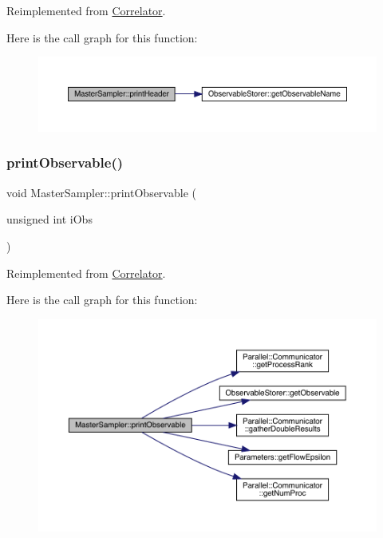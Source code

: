 Reimplemented from \mbox{\hyperlink{class_correlator_ac7c5a07d7cbee97c417a1659b93083b2}{Correlator}}.

Here is the call graph for this function\+:\nopagebreak
\begin{figure}[H]
\begin{center}
\leavevmode
\includegraphics[width=350pt]{class_master_sampler_a51b207672764c100e1ae258fd2e33fcf_cgraph}
\end{center}
\end{figure}
\mbox{\label{class_master_sampler_a41853c3e4ab52fca7d93cf80e8702b7a}} 
\subsubsection{\texorpdfstring{printObservable()}{printObservable()}}
{\footnotesize\ttfamily void Master\+Sampler\+::print\+Observable (\begin{DoxyParamCaption}\item[{unsigned int}]{i\+Obs }\end{DoxyParamCaption})\hspace{0.3cm}{\ttfamily [virtual]}}



Reimplemented from \mbox{\hyperlink{class_correlator_a15744ddb9f2b71fff34ac762d101df38}{Correlator}}.

Here is the call graph for this function\+:\nopagebreak
\begin{figure}[H]
\begin{center}
\leavevmode
\includegraphics[width=350pt]{class_master_sampler_a41853c3e4ab52fca7d93cf80e8702b7a_cgraph}
\end{center}
\end{figure}
\mbox{\label{class_master_sampler_a9accfc83c05d3013396355e40257a562}} 
